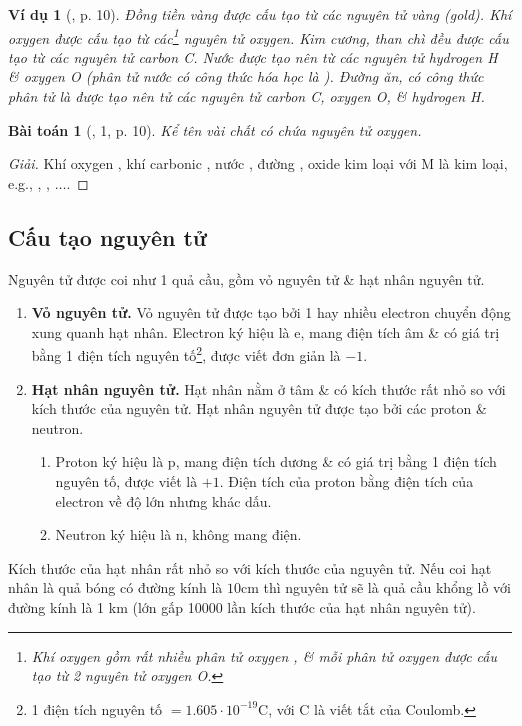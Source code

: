 \documentclass{article}
\newtheorem{baitoan}{Bài toán}
\newtheorem{vidu}{Ví dụ}
\begin{document}
\begin{vidu}[\cite{SGK_KHTN_7_Canh_Dieu}, p. 10]
	Đồng tiền vàng được cấu tạo từ các nguyên tử \emph{vàng (gold)}. Khí oxygen \emph{} được cấu tạo từ các\footnote{Khí oxygen gồm rất nhiều phân tử oxygen , \& mỗi phân tử  oxygen được cấu tạo từ 2 nguyên tử oxygen O.} nguyên tử oxygen. Kim cương, than chì đều được cấu tạo từ các nguyên tử carbon \emph{C}. Nước được tạo nên từ các nguyên tử hydrogen \emph{H} \& oxygen \emph{O} (phân tử nước có công thức hóa học là \emph{}). Đường ăn, có công thức phân tử là \emph{} được tạo nên tử các nguyên tử carbon \emph{C}, oxygen \emph{O}, \& hydrogen \emph{H}.
\end{vidu}

\begin{baitoan}[\cite{SGK_KHTN_7_Canh_Dieu}, 1, p. 10]
	Kể tên vài chất có chứa nguyên tử oxygen.
\end{baitoan}

\begin{proof}[Giải]
	Khí oxygen , khí carbonic , nước , đường , oxide kim loại  với M là kim loại, e.g., , , $\ldots$.
\end{proof}

\subsection{Cấu tạo nguyên tử}
Nguyên tử được coi như 1 quả cầu, gồm vỏ nguyên tử \& hạt nhân nguyên tử.
\begin{enumerate}
	\item \textbf{Vỏ nguyên tử.} Vỏ nguyên tử được tạo bởi 1 hay nhiều electron chuyển động xung quanh hạt nhân. Electron ký hiệu là e, mang điện tích âm \& có giá trị bằng 1 điện tích nguyên tố\footnote{1 điện tích nguyên tố $= 1.605\cdot10^{-19}$C, với C là viết tắt của Coulomb.}, được viết đơn giản là $-1$.
	\item \textbf{Hạt nhân nguyên tử.} Hạt nhân nằm ở tâm \& có kích thước rất nhỏ so với kích thước của nguyên tử. Hạt nhân nguyên tử được tạo bởi các proton \& neutron.
	\begin{enumerate}
		\item Proton ký hiệu là p, mang điện tích dương \& có giá trị bằng 1 điện tích nguyên tố, được viết là $+1$. Điện tích của proton bằng điện tích của electron về độ lớn nhưng khác dấu.
		\item Neutron ký hiệu là n, không mang điện.
	\end{enumerate}
\end{enumerate}
Kích thước của hạt nhân rất nhỏ so với kích thước của nguyên tử. Nếu coi hạt nhân là quả bóng có đường kính là $10$cm thì nguyên tử sẽ là quả cầu khổng lồ với đường kính là 1 km (lớn gấp 10000 lần kích thước của hạt nhân nguyên tử).
\end{document}
